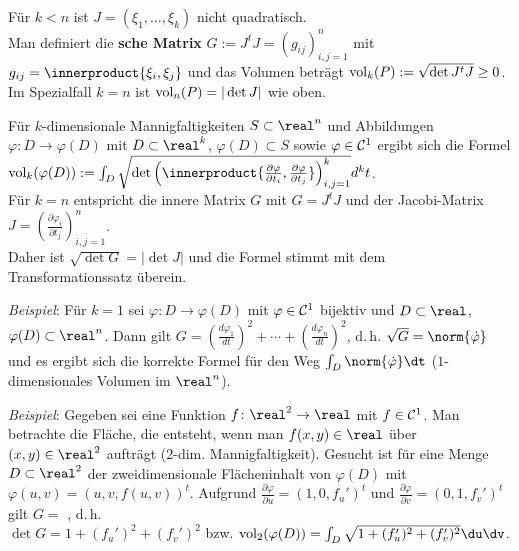 Für $k < n$ ist $J = (\xi_1, \dotsc, \xi_k)$ nicht quadratisch. \\
Man definiert die \textbf{sche Matrix}
$G := J^t J = (g_{ij})_{i,j=1}^n$ mit
$g_{ij} = \innerproduct{\xi_i, \xi_j}$ und das Volumen beträgt
${\operatorname{vol}}_k(P) := \sqrt{\det J^t J} \ge 0$.
Im Spezialfall $k = n$ ist ${\operatorname{vol}}_n(P) = |\det J|$ wie oben.

\linie

Für $k$-dimensionale Mannigfaltigkeiten $S \subset \real^n$
und Abbildungen
$\varphi\colon D \rightarrow \varphi(D)$ mit $D \subset \real^k$,
$\varphi(D) \subset S$ sowie $\varphi \in \mathcal{C}^1$ ergibt sich die Formel
$\vol_k(\varphi(D)) := \int_D \sqrt{\det\left(\innerproduct{\frac{\partial
\varphi}{\partial t_i}, \frac{\partial
\varphi}{\partial t_j}}\right)_{i,j=1}^k} d^k t$. \\
Für $k = n$ entspricht die innere Matrix $G$ mit $G = J^t J$
und der Jacobi-Matrix
$J = \left(\frac{\partial \varphi_i}{\partial t_j}\right)_{i,j=1}^n$. \\
Daher ist $\sqrt{\det G} = |\det J|$ und die Formel stimmt mit dem
Transformationssatz überein.

\linie

\emph{Beispiel}:
Für $k = 1$ sei $\varphi\colon D \rightarrow \varphi(D)$ mit
$\varphi \in \mathcal{C}^1$ bijektiv und $D \subset \real$,
$\varphi(D) \subset \real^n$.
Dann gilt $G = \left(\frac{d \varphi_1}{dt}\right)^2 + \dotsb +
\left(\frac{d \varphi_n}{dt}\right)^2$, d.\,h.
$\sqrt{G} = \norm{\dot{\varphi}}$ und es ergibt sich die korrekte Formel für
den Weg $\int_D \norm{\dot{\varphi}} \dt$
($1$-dimensionales Volumen im $\real^n$).

\linie

\emph{Beispiel}:
Gegeben sei eine Funktion $f\colon \real^2 \rightarrow \real$ mit $f \in \mathcal{C}^1$.
Man betrachte die Fläche, die entsteht, wenn man $f(x, y) \in \real$ über
$(x, y) \in \real^2$ aufträgt ($2$-dim. Mannigfaltigkeit).
Gesucht ist für eine Menge $D \subset \real^2$ der zweidimensionale
Flächeninhalt von $\varphi(D)$ mit
$\varphi(u, v) = (u, v, f(u, v))^t$.
Aufgrund $\frac{\partial \varphi}{\partial u} = (1, 0, f_u')^t$ und
$\frac{\partial \varphi}{\partial v} = (0, 1, f_v')^t$ gilt
$G =$ , d.\,h. \\
$\det G = 1 + (f_u')^2 + (f_v')^2$ bzw.
$\vol_2(\varphi(D)) = \int_D \sqrt{1 + (f_u')^2 + (f_v')^2} \du\dv$.

